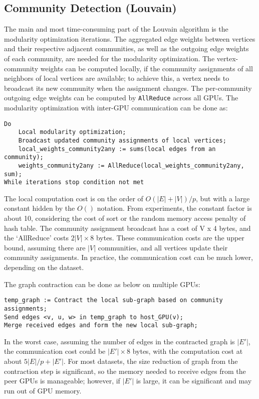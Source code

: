 \documentclass[10pt,oneside]{memoir}
\begin{document}
\hypertarget{community-detection-louvain-2}{%
\subsection{Community Detection
(Louvain)}\label{community-detection-louvain-2}}

The main and most time-consuming part of the Louvain algorithm is the
modularity optimization iterations. The aggregated edge weights between
vertices and their respective adjacent communities, as well as the
outgoing edge weights of each community, are needed for the modularity
optimization. The vertex-community weights can be computed locally, if
the community assignments of all neighbors of local vertices are
available; to achieve this, a vertex needs to broadcast its new
community when the assignment changes. The per-community outgoing edge
weights can be computed by \texttt{AllReduce} across all GPUs. The
modularity optimization with inter-GPU communication can be done as:

\begin{verbatim}
Do
    Local modularity optimization;
    Broadcast updated community assignments of local vertices;
    local_weights_community2any := sums(local edges from an community);
    weights_community2any := AllReduce(local_weights_community2any, sum);
While iterations stop condition not met
\end{verbatim}

The local computation cost is on the order of \(O(|E| + |V|)/p\), but
with a large constant hidden by the \(O()\) notation. From experiments,
the constant factor is about 10, considering the cost of sort or the
random memory access penalty of hash table. The community assignment
broadcast has a cost of \textbar{}V\textbar{} x 4 bytes, and the
`AllReduce' costs \(2|V| \times 8\) bytes. These communication costs are
the upper bound, assuming there are \(|V|\) communities, and all
vertices update their community assignments. In practice, the
communication cost can be much lower, depending on the dataset.

The graph contraction can be done as below on multiple GPUs:

\begin{verbatim}
temp_graph := Contract the local sub-graph based on community assignments;
Send edges <v, u, w> in temp_graph to host_GPU(v);
Merge received edges and form the new local sub-graph;
\end{verbatim}

In the worst case, assuming the number of edges in the contracted graph
is \(|E'|\), the communication cost could be \(|E'| \times 8\) bytes,
with the computation cost at about \(5|E|/p + |E'|\). For most datasets,
the size reduction of graph from the contraction step is significant, so
the memory needed to receive edges from the peer GPUs is manageable;
however, if \(|E'|\) is large, it can be significant and may run out of
GPU memory.
\end{document}
